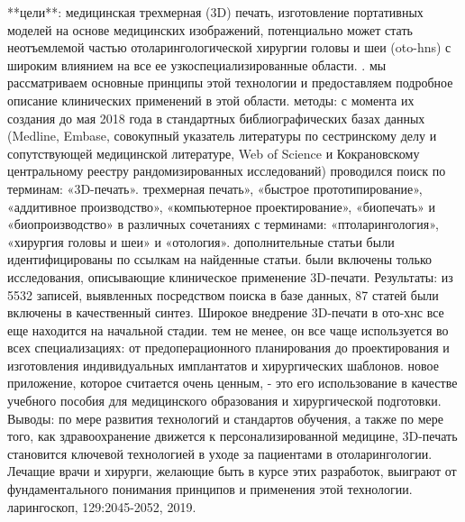 **цели**: медицинская трехмерная (3D) печать, изготовление портативных моделей
на основе медицинских изображений, потенциально может стать неотъемлемой частью
отоларингологической хирургии головы и шеи (oto-hns) с широким влиянием на все
ее узкоспециализированные области. . мы рассматриваем основные принципы этой
технологии и предоставляем подробное описание клинических применений в этой
области. методы: с момента их создания до мая 2018 года в стандартных
библиографических базах данных (Medline, Embase, совокупный указатель литературы
по сестринскому делу и сопутствующей медицинской литературе, Web of Science и
Кокрановскому центральному реестру рандомизированных исследований) проводился
поиск по терминам: «3D-печать». трехмерная печать», «быстрое прототипирование»,
«аддитивное производство», «компьютерное проектирование», «биопечать» и
«биопроизводство» в различных сочетаниях с терминами: «птоларингология»,
«хирургия головы и шеи» и «отология». дополнительные статьи были
идентифицированы по ссылкам на найденные статьи. были включены только
исследования, описывающие клиническое применение 3D-печати. Результаты: из 5532
записей, выявленных посредством поиска в базе данных, 87 статей были включены в
качественный синтез. Широкое внедрение 3D-печати в ото-хнс все еще находится на
начальной стадии. тем не менее, он все чаще используется во всех специализациях:
от предоперационного планирования до проектирования и изготовления
индивидуальных имплантатов и хирургических шаблонов. новое приложение, которое
считается очень ценным, - это его использование в качестве учебного пособия для
медицинского образования и хирургической подготовки. Выводы: по мере развития
технологий и стандартов обучения, а также по мере того, как здравоохранение
движется к персонализированной медицине, 3D-печать становится ключевой
технологией в уходе за пациентами в отоларингологии. Лечащие врачи и хирурги,
желающие быть в курсе этих разработок, выиграют от фундаментального понимания
принципов и применения этой технологии. ларингоскоп, 129:2045-2052,
2019.\cite{hong2019}
